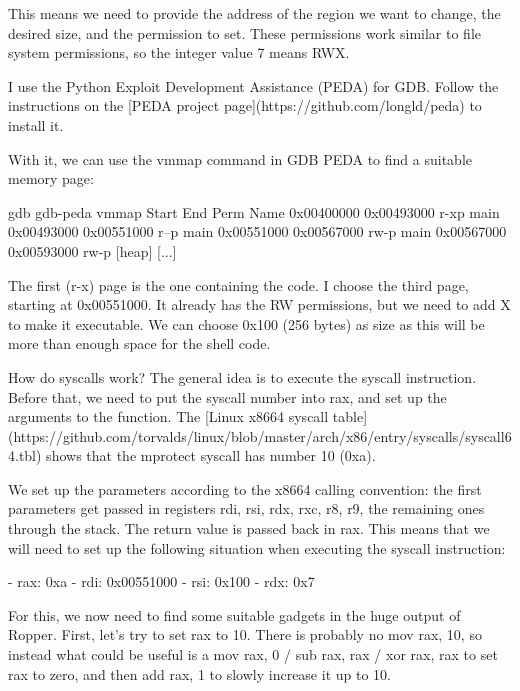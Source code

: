         This means we need to provide the address of the region we want to change, the desired size, and the permission to set.
        These permissions work similar to file system permissions, so the integer value 7 means RWX.

        I use the Python Exploit Development Assistance (PEDA) for GDB. Follow the instructions on the
        [PEDA project page](https://github.com/longld/peda) to install it.

        With it, we can use the vmmap command in GDB PEDA to find a suitable memory page:

        gdb
        gdb-peda vmmap
        Start              End                Perm	Name
        0x00400000         0x00493000         r-xp	main
        0x00493000         0x00551000         r--p	main
        0x00551000         0x00567000         rw-p	main
        0x00567000         0x00593000         rw-p	[heap]
        [...]


        The first (r-x) page is the one containing the code. I choose the third page, starting at 0x00551000. It already has
        the RW permissions, but we need to add X to make it executable. We can choose 0x100 (256 bytes) as size as this will
        be more than enough space for the shell code.

        How do syscalls work? The general idea is to execute the syscall instruction. Before that, we need to put the syscall
        number into rax, and set up the arguments to the function. The [Linux x8664 syscall table](https://github.com/torvalds/linux/blob/master/arch/x86/entry/syscalls/syscall64.tbl)
        shows that the mprotect syscall has number 10 (0xa).

        We set up the parameters according to the x8664 calling convention: the first parameters get passed in registers rdi,
        rsi, rdx, rxc, r8, r9, the remaining ones through the stack. The return value is passed back in rax. This means
        that we will need to set up the following situation when executing the syscall instruction:

        - rax: 0xa
        - rdi: 0x00551000
        - rsi: 0x100
        - rdx: 0x7

        For this, we now need to find some suitable gadgets in the huge output of Ropper. First, let's try to set rax to 10.
        There is probably no mov rax, 10, so instead what could be useful is a mov rax, 0 / sub rax, rax / xor rax, rax
        to set rax to zero, and then add rax, 1 to slowly increase it up to 10.

